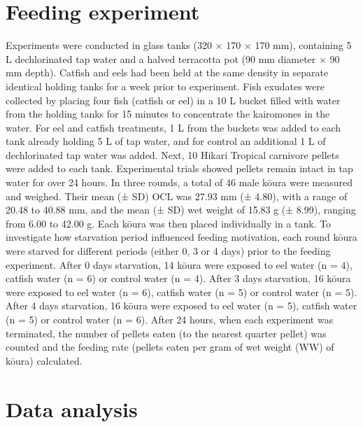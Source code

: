 \documentclass[
  12pt,
  a4paper,
]{scrbook}
\begin{document}
\section{Feeding experiment}\label{feeding-experiment}

Experiments were conducted in glass tanks (320 × 170 × 170 mm),
containing 5 L dechlorinated tap water and a halved terracotta pot (90
mm diameter × 90 mm depth). Catfish and eels had been held at the same
density in separate identical holding tanks for a week prior to
experiment. Fish exudates were collected by placing four fish (catfish
or eel) in a 10 L bucket filled with water from the holding tanks for 15
minutes to concentrate the kairomones in the water. For eel and catfish
treatments, 1 L from the buckets was added to each tank already holding
5 L of tap water, and for control an additional 1 L of dechlorinated tap
water was added. Next, 10 Hikari Tropical carnivore pellets were added
to each tank. Experimental trials showed pellets remain intact in tap
water for over 24 hours. In three rounds, a total of 46 male kōura were
measured and weighed. Their mean (± SD) OCL was 27.93 mm (± 4.80), with
a range of 20.48 to 40.88 mm, and the mean (± SD) wet weight of 15.83 g
(± 8.99), ranging from 6.00 to 42.00 g. Each kōura was then placed
individually in a tank. To investigate how starvation period influenced
feeding motivation, each round kōura were starved for different periods
(either 0, 3 or 4 days) prior to the feeding experiment. After 0 days
starvation, 14 kōura were exposed to eel water (n = 4), catfish water (n
= 6) or control water (n = 4). After 3 days starvation, 16 kōura were
exposed to eel water (n = 6), catfish water (n = 5) or control water (n
= 5). After 4 days starvation, 16 kōura were exposed to eel water (n =
5), catfish water (n = 5) or control water (n = 6). After 24 hours, when
each experiment was terminated, the number of pellets eaten (to the
nearest quarter pellet) was counted and the feeding rate (pellets eaten
per gram of wet weight (WW) of kōura) calculated.

\section{Data analysis}\label{data-analysis}
\end{document}
